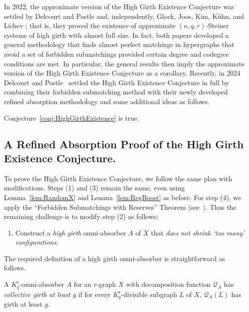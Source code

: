 \documentclass[twoside,leqno]{article}
\begin{document}
In 2022, the approximate version of the High Girth Existence Conjecture was settled by Delcourt and Postle \cite{DP22} and, independently, Glock, Joos, Kim, K{\"u}hn, and Lichev \cite{GJKKL24}; that is, they proved the existence of approximate $(n, q, r)$-Steiner systems of high girth with almost full size. In fact, both papers developed a general methodology that finds almost perfect matchings in hypergraphs that avoid a set of forbidden submatchings provided certain degree and codegree conditions are met. In particular, the general results then imply the approximate version of the High Girth Existence Conjecture as a corollary. Recently, in 2024 Delcourt and Postle~\cite{DPII} settled the High Girth Existence Conjecture in full by combining their forbidden submatching method with their newly developed refined absorption methodology and some additional ideas as follows.

\begin{thm}\label{thm:DPHighGirth}
Conjecture~\ref{conj:HighGirthExistence} is true.
\end{thm}

\subsection{A Refined Absorption Proof of the High Girth Existence Conjecture.}

To prove the High Girth Existence Conjecture, we follow the same plan with modifications. Steps (1) and (3) remain the same, even using Lemma~\ref{lem:RandomX} and Lemma~\ref{lem:RegBoost} as before. For step (4), we apply the ``Forbidden Submatchings with Reserves'' Theorem (see~\cite{DPII}). Thus the remaining challenge is to modify step (2) as follows:
\begin{enumerate}
    \item[(2')] Construct a \emph{high girth} omni-absorber $A$ of $X$ that \emph{does not shrink `too many' configurations}. 
\end{enumerate}

The required definition of a high girth omni-absorber is straightforward as follows. 

\begin{definition}\label{def:OmniAbsorberCollectiveGirth}
A $K_q^r$-omni-absorber $A$ for an $r$-graph $X$ with decomposition function $\mathcal{Q}_A$ has \emph{collective girth at least $g$} if for every $K_q^r$-divisible subgraph $L$ of $X$, $\mathcal{Q}_A(L)$ has girth at least $g$. 
\end{definition}
\end{document}
